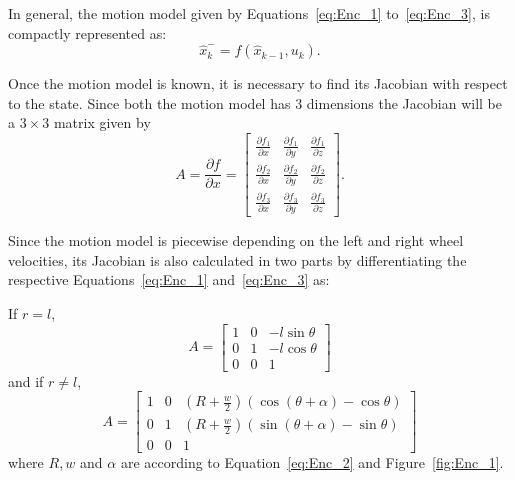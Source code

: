 In general, the motion model given by Equations~\ref{eq:Enc_1} to~\ref{eq:Enc_3}, is compactly represented as:
\begin{equation}
\label{eq:Enc_4}
\hat{x}^-_k = f(\hat{x}_{k-1},u_k).
\end{equation}

Once the motion model is known, it is necessary to find its Jacobian with respect to the state. Since both the motion model has 3 dimensions the Jacobian will be a $ 3\times 3 $ matrix given by
\begin{equation}
\label{eq:Enc_5}
A = \frac{\partial f}{\partial x} = 
\begin{bmatrix}
\frac{\partial f_1}{\partial x} & \frac{\partial f_1}{\partial y} & \frac{\partial f_1}{\partial z} \\
\frac{\partial f_2}{\partial x} & \frac{\partial f_2}{\partial y} & \frac{\partial f_2}{\partial z} \\
\frac{\partial f_3}{\partial x} & \frac{\partial f_3}{\partial y} & \frac{\partial f_3}{\partial z}
\end{bmatrix}.
\end{equation}

Since the motion model is piecewise depending on the left and right wheel velocities, its Jacobian is also calculated in two parts by differentiating the respective Equations~\ref{eq:Enc_1} and~\ref{eq:Enc_3} as:

If $ r = l $,
\begin{equation}
\label{eq:Enc_6}
A = 
\begin{bmatrix}
1 & 0 & -l\sin\theta\\
0 & 1 & -l\cos\theta\\
0 & 0 & 1
\end{bmatrix}
\end{equation}
and if $ r \neq l $,
\begin{equation}
\label{eq:Enc_7}
A = 
\begin{bmatrix}
1 & 0 & (R+\frac{w}{2})(\cos(\theta+\alpha)-\cos\theta)\\
0 & 1 & (R+\frac{w}{2})(\sin(\theta+\alpha)-\sin\theta)\\
0 & 0 & 1
\end{bmatrix}
\end{equation}
where $ R,w $ and $ \alpha $ are according to Equation~\ref{eq:Enc_2} and Figure~\ref{fig:Enc_1}.

